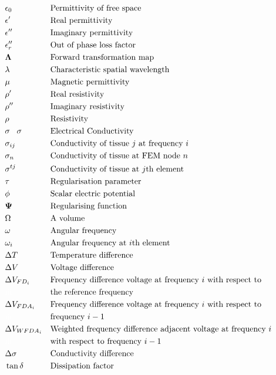 \pagebreak
\begin{align*}
	&\epsilon_0 &&\text{Permittivity of free space}\\
	&\epsilon' &&\text{Real permittivity}\\
	&\epsilon'' &&\text{Imaginary permittivity}\\
	&\epsilon_r'' &&\text{Out of phase loss factor}\\
	&\boldsymbol{\Lambda} &&\text{Forward transformation map}\\
	&\lambda &&\text{Characteristic spatial wavelength}\\
	&\mu &&\text{Magnetic permittivity}\\
	&\rho' &&\text{Real resistivity}\\
	&\rho'' &&\text{Imaginary resistivity}\\
	&\rho &&\text{Resistivity}\\
	&\sigma \text{\textcolor{white}{iii}} \sigma &&\text{Electrical Conductivity}\\
	&\sigma_{ij} &&\text{Conductivity of tissue } j \text{ at frequency } i \\
	&\sigma_{n} &&\text{Conductivity of tissue at FEM node } n \\
	&\sigma^{tj} &&\text{Conductivity of tissue at } j \text{th element}\\
	&\tau &&\text{Regularisation parameter}\\
	&\phi &&\text{Scalar electric potential}\\
	&\boldsymbol{\Psi} &&\text{Regularising function}\\
	&\Omega &&\text{A volume}\\
	&\omega &&\text{Angular frequency}\\
	&\omega_{i} &&\text{Angular frequency at } i \text{th element}\\
	&\Delta T &&\text{Temperature difference}\\
	&\Delta V &&\text{Voltage difference}\\
	&\Delta V_{FD_i} &&\text{Frequency difference voltage at frequency } i \text{ with respect to}\\
	&\text{\textcolor{white}{iii}} &&\text{the reference frequency}\\
	&\Delta V_{FDA_i} &&\text{Frequency difference voltage at frequency } i \text{ with respect to}\\
	&\text{\textcolor{white}{iii}} &&\text{frequency } i - 1 \\
	&\Delta V_{WFDA_i} &&\text{Weighted frequency difference adjacent voltage at frequency } i \\
	&\text{\textcolor{white}{iii}} &&\text{with respect to frequency } i - 1 \\
	&\Delta \sigma &&\text{Conductivity difference}\\			
	&\tan \delta &&\text{Dissipation factor}\\
\end{align*}

